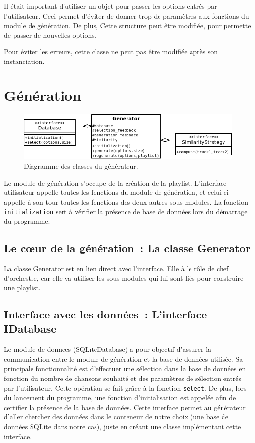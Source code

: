 Il était important d'utiliser un objet pour passer les options entrés par
l'utilisateur. Ceci permet d’éviter de donner trop de paramètres aux fonctions
du module de génération. De plus, Cette structure peut être modifiée, pour
permette de passer de nouvelles options.

Pour éviter les erreurs, cette classe ne peut pas être modifiée après son
instanciation.

\section{Génération}
\label{archi:generation}

\begin{figure}[H]
\includegraphics[width=\textwidth]{data/archi/generator.png}
\caption{Diagramme des classes du générateur.}
\end{figure}

Le module de génération s'occupe de la création de la playlist. 
L'interface utilisateur appelle toutes les fonctions du module 
de génération, et celui-ci appelle à son tour toutes les fonctions des deux 
autres sous-modules. La fonction \texttt{initialization} sert à vérifier la 
présence de base de données lors du démarrage du programme. 

\subsection{Le cœur de la génération~: La classe Generator}
\label{archi:generation:generator}

La classe Generator est en lien direct avec l’interface. Elle à le rôle de chef
d'orchestre, car elle va utiliser les sous-modules qui lui sont liés pour
construire une playlist.

\subsection{Interface avec les données~: L'interface IDatabase}
\label{archi:generation:database}

Le module de données (SQLiteDatabase) a pour objectif d'assurer la 
communication entre le module de génération et la base de données utilisée. 
Sa principale fonctionnalité est d'effectuer une sélection dans la base de 
données en fonction du nombre de chansons souhaité et des paramètres de 
sélection entrés par l'utilisateur. Cette opération se fait grâce à la 
fonction \texttt{select}. De plus, lors du lancement du programme, une 
fonction d'initialisation est appelée afin de certifier la présence de la 
base de données.
Cette interface permet au générateur d'aller chercher des données dans le
conteneur de notre choix (une base de données SQLite dans notre cas), juste
en créant une classe implémentant cette interface.

